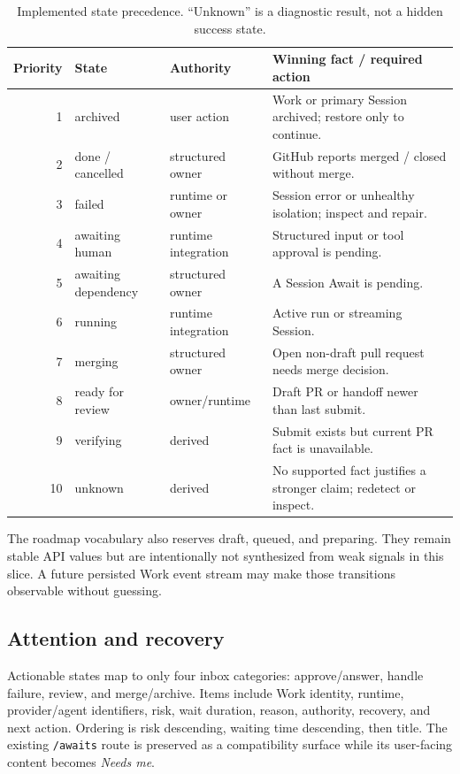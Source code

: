 \documentclass[10pt,a4paper]{article}
\newcommand{\code}[1]{\texttt{#1}}
\begin{document}
\begin{table}[ht]
\centering
\small
\begin{tabularx}{\textwidth}{@{}r l l X@{}}
\toprule
Priority & State & Authority & Winning fact / required action \\
\midrule
1 & archived & user action & Work or primary Session archived; restore only to continue. \\
2 & done / cancelled & structured owner & GitHub reports merged / closed without merge. \\
3 & failed & runtime or owner & Session error or unhealthy isolation; inspect and repair. \\
4 & awaiting human & runtime integration & Structured input or tool approval is pending. \\
5 & awaiting dependency & structured owner & A Session Await is pending. \\
6 & running & runtime integration & Active run or streaming Session. \\
7 & merging & structured owner & Open non-draft pull request needs merge decision. \\
8 & ready for review & owner/runtime & Draft PR or handoff newer than last submit. \\
9 & verifying & derived & Submit exists but current PR fact is unavailable. \\
10 & unknown & derived & No supported fact justifies a stronger claim; redetect or inspect. \\
\bottomrule
\end{tabularx}
\caption{Implemented state precedence. ``Unknown'' is a diagnostic result, not
a hidden success state.}
\label{tab:precedence}
\end{table}

The roadmap vocabulary also reserves draft, queued, and preparing.  They remain
stable API values but are intentionally not synthesized from weak signals in
this slice.  A future persisted Work event stream may make those transitions
observable without guessing.

\subsection{Attention and recovery}

Actionable states map to only four inbox categories: approve/answer, handle
failure, review, and merge/archive.  Items include Work identity, runtime,
provider/agent identifiers, risk, wait duration, reason, authority, recovery,
and next action.  Ordering is risk descending, waiting time descending, then
title.  The existing \code{/awaits} route is preserved as a compatibility
surface while its user-facing content becomes \emph{Needs me}.
\end{document}
